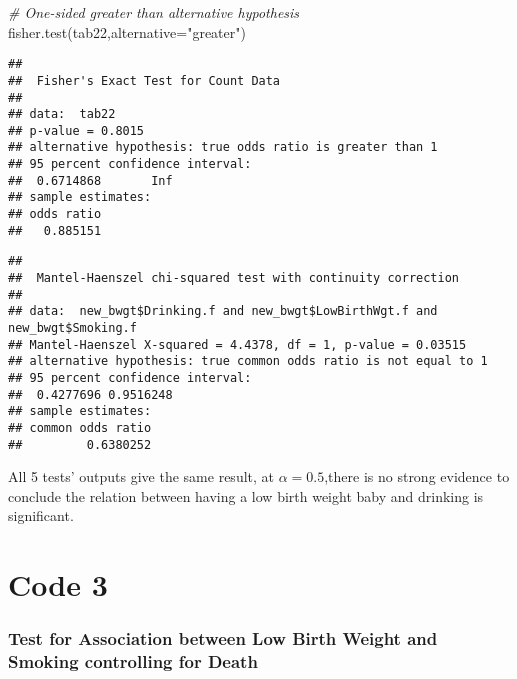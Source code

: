 \documentclass[
]{article}
\newenvironment{Shaded}{\begin{snugshade}}{\end{snugshade}}
\newcommand{\AttributeTok}[1]{\textcolor[rgb]{0.77,0.63,0.00}{#1}}
\newcommand{\CommentTok}[1]{\textcolor[rgb]{0.56,0.35,0.01}{\textit{#1}}}
\newcommand{\FunctionTok}[1]{\textcolor[rgb]{0.00,0.00,0.00}{#1}}
\newcommand{\NormalTok}[1]{#1}
\newcommand{\SpecialCharTok}[1]{\textcolor[rgb]{0.00,0.00,0.00}{#1}}
\newcommand{\StringTok}[1]{\textcolor[rgb]{0.31,0.60,0.02}{#1}}
\begin{document}
\begin{Shaded}
\begin{Highlighting}[]
\CommentTok{\# One{-}sided greater than alternative hypothesis}
\FunctionTok{fisher.test}\NormalTok{(tab22,}\AttributeTok{alternative=}\StringTok{"greater"}\NormalTok{)}
\end{Highlighting}
\end{Shaded}

\begin{verbatim}
## 
##  Fisher's Exact Test for Count Data
## 
## data:  tab22
## p-value = 0.8015
## alternative hypothesis: true odds ratio is greater than 1
## 95 percent confidence interval:
##  0.6714868       Inf
## sample estimates:
## odds ratio 
##   0.885151
\end{verbatim}

\begin{Shaded}
\end{Shaded}

\begin{verbatim}
## 
##  Mantel-Haenszel chi-squared test with continuity correction
## 
## data:  new_bwgt$Drinking.f and new_bwgt$LowBirthWgt.f and new_bwgt$Smoking.f
## Mantel-Haenszel X-squared = 4.4378, df = 1, p-value = 0.03515
## alternative hypothesis: true common odds ratio is not equal to 1
## 95 percent confidence interval:
##  0.4277696 0.9516248
## sample estimates:
## common odds ratio 
##         0.6380252
\end{verbatim}

All 5 tests' outputs give the same result, at \(\alpha=0.5\),there is no
strong evidence to conclude the relation between having a low birth
weight baby and drinking is significant.

\newpage

\hypertarget{code-3}{%
\section{Code 3}\label{code-3}}

\hypertarget{test-for-association-between-low-birth-weight-and-smoking-controlling-for-death}{%
\subsubsection{Test for Association between Low Birth Weight and Smoking
controlling for
Death}\label{test-for-association-between-low-birth-weight-and-smoking-controlling-for-death}}
\end{document}
